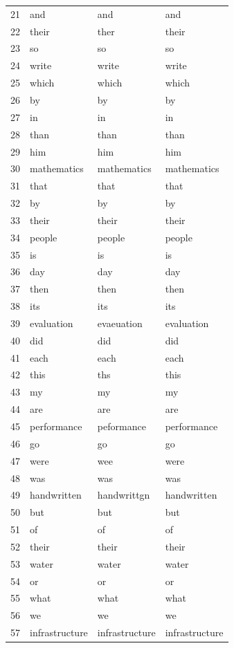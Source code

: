 \begin{longtable}{clll}
    21 & and & and & and \\
    22 & their & ther & their \\
    23 & so & so & so \\
    24 & write & write & write \\
    25 & which & which & which \\
    26 & by & by & by \\
    27 & in & in & in \\
    28 & than & than & than \\
    29 & him & him & him \\
    30 & mathematics & mathematics & mathematics \\
    31 & that & that & that \\
    32 & by & by & by \\
    33 & their & their & their \\
    34 & people & people & people \\
    35 & is & is & is \\
    36 & day & day & day \\
    37 & then & then & then \\
    38 & its & its & its \\
    39 & evaluation & evaeuation & evaluation \\
    40 & did & did & did \\
    41 & each & each & each \\
    42 & this & ths & this \\
    43 & my & my & my \\
    44 & are & are & are \\
    45 & performance & peformance & performance \\
    46 & go & go & go \\
    47 & were & wee & were \\
    48 & was & was & was \\
    49 & handwritten & handwrittgn & handwritten \\
    50 & but & but & but \\
    51 & of & of & of \\
    52 & their & their & their \\
    53 & water & water & water \\
    54 & or & or & or \\
    55 & what & what & what \\
    56 & we & we & we \\
    57 & infrastructure & infrastructure & infrastructure \\

\end{longtable}
